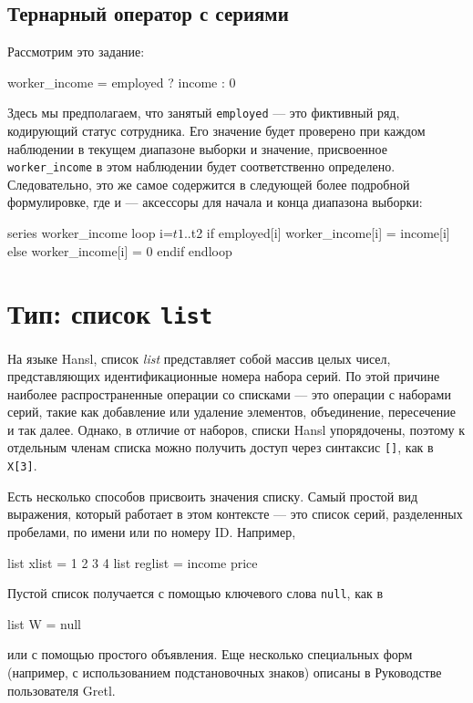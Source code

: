 \subsection{Тернарный оператор с сериями}

Рассмотрим это задание:

\begin{code}
  worker_income = employed ? income : 0
\end{code}
Здесь мы предполагаем, что занятый \verb|employed| --- это фиктивный
ряд, кодирующий статус сотрудника. Его значение будет проверено при
каждом наблюдении в текущем диапазоне выборки и значение, присвоенное
\texttt{worker\_income} в этом наблюдении будет соответственно
определено. Следовательно, это же самое содержится в следующей более
подробной формулировке, где  и  --- аксессоры
для начала и конца диапазона выборки:

\begin{code}
series worker_income
loop i=$t1..$t2
    if employed[i]
        worker_income[i] = income[i]
    else
        worker_income[i] = 0
    endif
endloop
\end{code}

\section{Тип: список \texttt{list}}
\label{sec:lists}

На языке Hansl, список \textit{list} представляет собой массив целых
чисел, представляющих идентификационные номера набора серий. По этой
причине наиболее распространенные операции со списками --- это
операции с наборами серий, такие как добавление или удаление
элементов, объединение, пересечение и так далее. Однако, в отличие от
наборов, списки Hansl упорядочены, поэтому к отдельным членам списка
можно получить доступ через синтаксис \texttt{[]}, как в
\texttt{X[3]}.

Есть несколько способов присвоить значения списку. Самый простой вид
выражения, который работает в этом контексте --- это список серий,
разделенных пробелами, по имени или по номеру ID. Например,

\begin{code}
list xlist = 1 2 3 4
list reglist = income price 
\end{code}
Пустой список получается с помощью ключевого слова \texttt{null}, как
в
\begin{code}
list W = null  
\end{code}
или с помощью простого объявления. Еще несколько специальных форм
(например, с использованием подстановочных знаков) описаны в
Руководстве пользователя Gretl.

